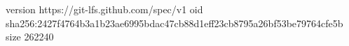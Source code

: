 version https://git-lfs.github.com/spec/v1
oid sha256:2427f4764b3a1b23ae6995bdac47cb88d1eff23cb8795a26bf53be79764cfe5b
size 262240
